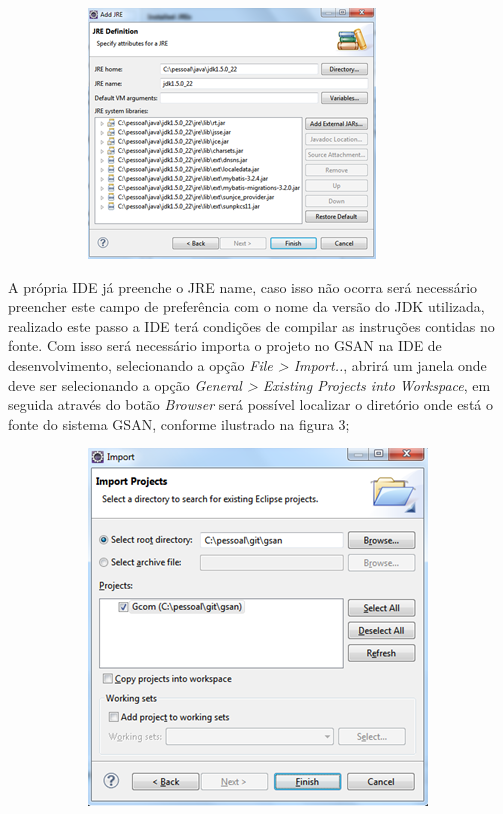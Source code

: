 \begin{apendicesenv}
\begin{figure}[H]
	\centering
	\caption*{\textbf{\fontsize{12}{1}\selectfont{Figura 2 - Adicionar nova JRE na IDE.}}}
	\label{figura:anexo2}
	\begin{subfigure}[H]{\textwidth}
		\centering
		\includegraphics{figuras/anexo/addJRE.png}
	\end{subfigure}
\end{figure}

A própria IDE já preenche o JRE name, caso isso não ocorra será necessário preencher este campo de preferência com o nome da versão do JDK utilizada, realizado este passo a IDE terá condições de compilar as instruções contidas no fonte.  Com isso será necessário importa o projeto no GSAN na IDE de desenvolvimento, selecionando a opção \textit{File > Import..}, abrirá um janela onde deve ser selecionando a opção \textit{General > Existing Projects into Workspace}, em seguida através do botão \textit{Browser} será possível localizar o diretório onde está o fonte do sistema GSAN, conforme ilustrado na figura 3;

\begin{figure}[H]
	\centering
	\caption*{\textbf{\fontsize{12}{1}\selectfont{figura 3 - Importar Sistema GSAN na IDE.}}}
	\label{figura:anexo3}
	\begin{subfigure}[H]{\textwidth}
		\centering
		\includegraphics{figuras/anexo/importGSAN.png}
	\end{subfigure}
\end{figure}



\end{apendicesenv}

